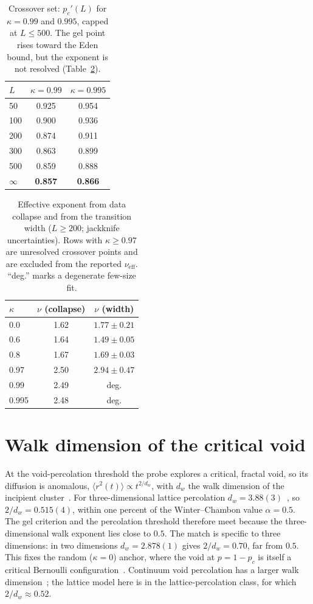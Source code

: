 \documentclass[aps,prl,twocolumn,superscriptaddress,floatfix,nofootinbib,longbibliography]{revtex4-2}
\newcommand{\msd}{\langle r^2(t)\rangle}
\newcommand{\pc}{p_c}
\newcommand{\pcp}{p_c'}
\newcommand{\kap}{\kappa}
\newcommand{\nueff}{\nu_{\mathrm{eff}}}
\begin{document}
\begin{table}[h]
\centering
\caption{Crossover set: $\pcp(L)$ for $\kap=0.99$ and $0.995$, capped at
$L\le500$. The gel point rises toward the Eden bound, but the exponent is not
resolved (Table~\ref{tab:nu}).}
\label{tab:pcLcross}
\begin{tabular}{lcc}
\toprule
$L$ & $\kap=0.99$ & $\kap=0.995$ \\
\midrule
50   & 0.925 & 0.954 \\
100  & 0.900 & 0.936 \\
200  & 0.874 & 0.911 \\
300  & 0.863 & 0.899 \\
500  & 0.859 & 0.888 \\
\midrule
$\infty$ & \textbf{0.857} & \textbf{0.866} \\
\bottomrule
\end{tabular}
\end{table}

\begin{table}[h]
\centering
\caption{Effective exponent from data collapse and from the transition width
($L\ge200$; jackknife uncertainties). Rows with $\kap\ge0.97$ are unresolved
crossover points and are excluded from the reported $\nueff$. ``deg.'' marks a
degenerate few-size fit.}
\label{tab:nu}
\begin{tabular}{lcc}
\toprule
$\kap$ & $\nu$ (collapse) & $\nu$ (width) \\
\midrule
0.0  & 1.62 & $1.77\pm0.21$ \\
0.6  & 1.64 & $1.49\pm0.05$ \\
0.8  & 1.67 & $1.69\pm0.03$ \\
0.97  & 2.50 & $2.94\pm0.47$ \\
0.99  & 2.49 & deg. \\
0.995 & 2.48 & deg. \\
\bottomrule
\end{tabular}
\end{table}

\section{Walk dimension of the critical void}
\label{app:dw}
At the void-percolation threshold the probe explores a critical, fractal void,
so its diffusion is anomalous, $\msd\propto t^{2/d_w}$, with $d_w$ the walk
dimension of the incipient cluster~\cite{Gefen1983,Havlin1983,Straley1980,Argyrakis1985}.
For three-dimensional lattice percolation $d_w=3.88(3)$~\cite{Kammerer2008}, so
$2/d_w=0.515(4)$, within one percent of the Winter--Chambon value $\alpha=0.5$.
The gel criterion and the percolation threshold therefore meet because the
three-dimensional walk exponent lies close to $0.5$. The match is specific to
three dimensions: in two dimensions $d_w=2.878(1)$ gives $2/d_w=0.70$, far
from $0.5$. This fixes the random ($\kap=0$) anchor, where the void at
$p=1-\pc$ is itself a critical Bernoulli configuration~\cite{AlexanderOrbach1982}.
Continuum void percolation has a larger walk dimension~\cite{Kammerer2008}; the
lattice model here is in the lattice-percolation class, for which
$2/d_w\approx0.52$.
\end{document}

